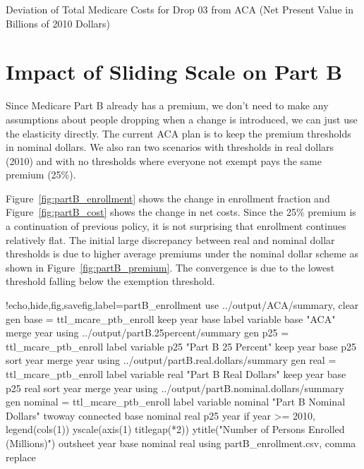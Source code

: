 \documentclass{article}
\begin{document}
\begin{table}[ht]
\centering
\caption{Deviation of Total Medicare Costs for Drop 03 from ACA (Net Present Value in Billions of 2010 Dollars)}
\label{tab:parta_deviation}
\end{table}

\section{Impact of Sliding Scale on Part B}

Since Medicare Part B already has a premium, we don't need to make any assumptions about people dropping when a change is introduced, we can just use the elasticity directly. The current ACA plan is to keep the premium thresholds in nominal dollars. We also ran two scenarios with thresholds in real dollars (2010) and with no thresholds where everyone not exempt pays the same premium (25\%).


Figure~\ref{fig:partB_enrollment} shows the change in enrollment fraction and Figure~\ref{fig:partB_cost} shows the change in net costs. Since the 25\% premium is a continuation of previous policy, it is not surprising that enrollment continues relatively flat. The initial large discrepancy between real and nominal dollar thresholds is due to higher average premiums under the nominal dollar scheme as shown in Figure~\ref{fig:partB_premium}. The convergence is due to the lowest threshold falling below the exemption threshold.

\begin{Statacode}{!echo,hide,fig,savefig,label=partB_enrollment}
use ../output/ACA/summary, clear
gen base = ttl_mcare_ptb_enroll
keep year base
label variable base "ACA"
merge year using ../output/partB.25percent/summary
gen p25 = ttl_mcare_ptb_enroll
label variable p25 "Part B 25 Percent"
keep year base p25
sort year
merge year using ../output/partB.real.dollars/summary
gen real = ttl_mcare_ptb_enroll
label variable real "Part B Real Dollars"
keep year base p25 real
sort year
merge year using ../output/partB.nominal.dollars/summary
gen nominal = ttl_mcare_ptb_enroll
label variable nominal "Part B Nominal Dollars"
twoway connected base nominal real p25 year if year >= 2010, legend(cols(1)) yscale(axis(1) titlegap(*2)) ytitle("Number of Persons Enrolled (Millions)")
outsheet year base nominal real using partB_enrollment.csv, comma replace
\end{Statacode}
\end{document}
